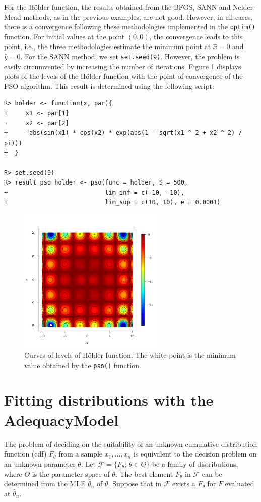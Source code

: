 \documentclass[10pt,letterpaper]{article}
\begin{document}
For the H\"{o}lder function, the results obtained from the BFGS, SANN and Nelder-Mead methods, as in the previous examples, are not good.
However, in all cases, there is a convergence following these methodologies implemented in the \texttt{optim()} function. For initial values at
the point $(0,0)$, the convergence leads to this point, i.e., the three methodologies estimate the minimum point at $\hat{x} = 0$ and $\hat{y} = 0$.
For the SANN method, we set \texttt{set.seed(9)}. However, the problem is easily circumvented by increasing the number of iterations. Figure \ref{curves_holder} displays plots of the levels of the H\"{o}lder function with the point of convergence
of the PSO algorithm. This result is determined using the following script:
\begin{verbatim}
R> holder <- function(x, par){
+     x1 <- par[1]
+     x2 <- par[2]
+     -abs(sin(x1) * cos(x2) * exp(abs(1 - sqrt(x1 ^ 2 + x2 ^ 2) / pi)))
+  }

R> set.seed(9)
R> result_pso_holder <- pso(func = holder, S = 500,
+                           lim_inf = c(-10, -10),
+                           lim_sup = c(10, 10), e = 0.0001)
\end{verbatim}
\begin{figure}[H]
\centering
\includegraphics[width=7cm,height=7cm]{curve_holder}
\caption{Curves of levels of H\"{o}lder function. The white point is the minimum value obtained by the \texttt{pso()} function.}
\label{curves_holder}
\end{figure}


\section{Fitting distributions with the AdequacyModel}
The problem of deciding on the suitability of an unknown cumulative distribution function (cdf) $F_\theta$
from a sample $x_1,\ldots,x_n$ is equivalent to the decision problem on an unknown parameter $\theta$. Let $\mathcal{F} = \{F_\theta;\,\theta \in \Theta \}$ be a family of distributions, where $\Theta$ is the parameter space of $\theta$. The best element $F_{\theta}$ in $\mathcal{F}$ can be determined from the MLE $\hat{\theta}_n$ of $\theta$. Suppose that in $\mathcal{F}$ exists a $F_{\theta}$ for $F$ evaluated at $\hat{\theta}_n$.
\end{document}
